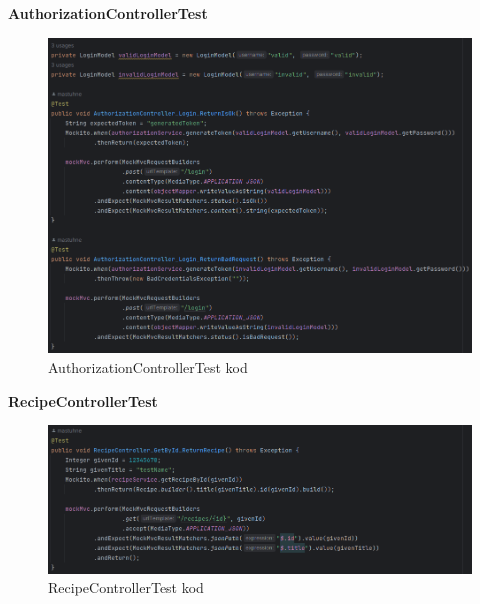 			\noindent\textbf{AuthorizationControllerTest}
			\begin{figure}[H]
				\includegraphics[scale=0.45]{slike/auth_controller_test.png}
				\centering
				\caption{AuthorizationControllerTest kod}
				\label{fig:authtest}
			\end{figure}

			\noindent\textbf{RecipeControllerTest}
			\begin{figure}[H]
				\includegraphics[scale=0.45]{slike/recipe_controller_test.png}
				\centering
				\caption{RecipeControllerTest kod}
				\label{fig:reccontrolltest}
			\end{figure}

